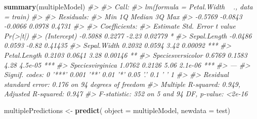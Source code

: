 \documentclass[]{book}
\newenvironment{Shaded}{\begin{snugshade}}{\end{snugshade}}
\newcommand{\CommentTok}[1]{\textcolor[rgb]{0.56,0.35,0.01}{\textit{#1}}}
\newcommand{\DataTypeTok}[1]{\textcolor[rgb]{0.13,0.29,0.53}{#1}}
\newcommand{\DecValTok}[1]{\textcolor[rgb]{0.00,0.00,0.81}{#1}}
\newcommand{\FloatTok}[1]{\textcolor[rgb]{0.00,0.00,0.81}{#1}}
\newcommand{\KeywordTok}[1]{\textcolor[rgb]{0.13,0.29,0.53}{\textbf{#1}}}
\newcommand{\NormalTok}[1]{#1}
\newcommand{\OperatorTok}[1]{\textcolor[rgb]{0.81,0.36,0.00}{\textbf{#1}}}
\newcommand{\StringTok}[1]{\textcolor[rgb]{0.31,0.60,0.02}{#1}}
\begin{document}
\begin{Shaded}
\begin{Highlighting}[]
\KeywordTok{summary}\NormalTok{(multipleModel)}
\CommentTok{#> }
\CommentTok{#> Call:}
\CommentTok{#> lm(formula = Petal.Width ~ ., data = train)}
\CommentTok{#> }
\CommentTok{#> Residuals:}
\CommentTok{#>     Min      1Q  Median      3Q     Max }
\CommentTok{#> -0.5769 -0.0843 -0.0066  0.0978  0.4731 }
\CommentTok{#> }
\CommentTok{#> Coefficients:}
\CommentTok{#>                   Estimate Std. Error t value Pr(>|t|)    }
\CommentTok{#> (Intercept)        -0.5088     0.2277   -2.23  0.02779 *  }
\CommentTok{#> Sepal.Length       -0.0486     0.0593   -0.82  0.41435    }
\CommentTok{#> Sepal.Width         0.2032     0.0594    3.42  0.00092 ***}
\CommentTok{#> Petal.Length        0.2103     0.0641    3.28  0.00146 ** }
\CommentTok{#> Speciesversicolor   0.6769     0.1583    4.28  4.5e-05 ***}
\CommentTok{#> Speciesvirginica    1.0762     0.2126    5.06  2.1e-06 ***}
\CommentTok{#> ---}
\CommentTok{#> Signif. codes:  0 '***' 0.001 '**' 0.01 '*' 0.05 '.' 0.1 ' ' 1}
\CommentTok{#> }
\CommentTok{#> Residual standard error: 0.176 on 94 degrees of freedom}
\CommentTok{#> Multiple R-squared:  0.949,  Adjusted R-squared:  0.947 }
\CommentTok{#> F-statistic:  352 on 5 and 94 DF,  p-value: <2e-16}
\end{Highlighting}
\end{Shaded}

\begin{Shaded}
\begin{Highlighting}[]
\NormalTok{multiplePredictions <-}\StringTok{ }\KeywordTok{predict}\NormalTok{(}
  \DataTypeTok{object =}\NormalTok{ multipleModel,}
  \DataTypeTok{newdata =}\NormalTok{ test)}
\end{Highlighting}
\end{Shaded}

\begin{Shaded}
\end{Shaded}
\end{document}
